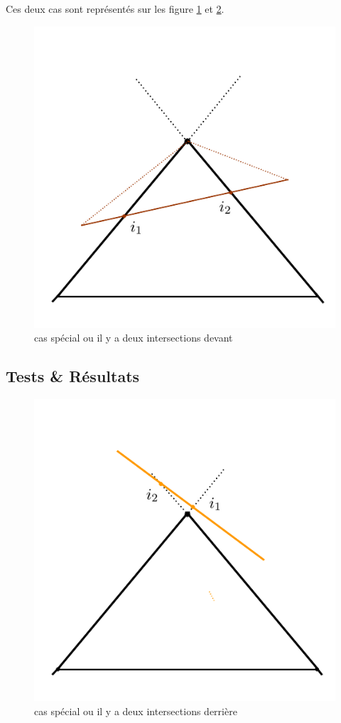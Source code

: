 \documentclass[11pt,a4paper]{article}
\theoremstyle{definition}
\theoremstyle{remark}
\begin{document}
Ces deux cas sont représentés sur les figure \ref{exp_5} et \ref{exp_6}.

\begin{figure}[H]
\centering
\includegraphics[scale=0.5]{casSpecial2.png}
\caption{cas spécial ou il y a deux intersections devant}
\label{exp_5}
\end{figure}
\subsection{Tests \& Résultats}

\begin{figure}[!h]
\centering
\includegraphics[scale=0.5]{casSpecial3.png}
\caption{cas spécial ou il y a deux intersections derrière}
\label{exp_6}
\end{figure}
\end{document}
